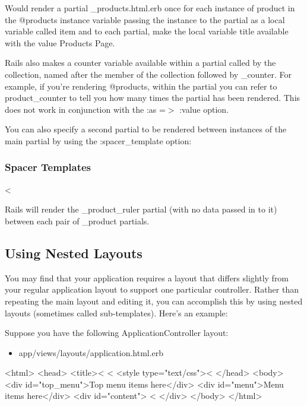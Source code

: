 \documentclass[10pt]{book}
\newenvironment{code}{%
  \scriptsize
    \verbatim
}{%
    \endverbatim
    \newline
}
\begin{document}
Would render a partial \_products.html.erb once for each instance of product in the @products instance variable passing the instance to the partial as a local variable called item and to each partial, make the local variable title available with the value Products Page.

Rails also makes a counter variable available  within a partial called by the collection, named after the member of the  collection followed by \_counter. For example, if you’re rendering @products, within the partial you can refer to product\_counter to tell you how many times the partial has been rendered. This does not work in conjunction with the :as =$>$ :value option.

You can also specify a second partial to be rendered between instances of the main partial by using the :spacer\_template option:

\subsubsection{ Spacer Templates}
\begin{code}
<%
\end{code}

Rails will render the \_product\_ruler partial (with no data passed in to it) between each pair of \_product partials.

\subsection{ Using Nested Layouts}

You may find that your application requires a layout that differs  slightly from your regular application layout to support one particular  controller. Rather than repeating the main layout and editing it, you  can accomplish this by using nested layouts (sometimes called  sub-templates). Here’s an example:

Suppose you have the following ApplicationController layout:
\begin{itemize}
	\item app/views/layouts/application.html.erb
\end{itemize}
\begin{code}
<html>
<head>
  <title><%
  <%
  <style type="text/css"><%
</head>
<body>
  <div id="top_menu">Top menu items here</div>
  <div id="menu">Menu items here</div>
  <div id="content">
    <%
  </div>
</body>
</html>
\end{code}
\end{document}
